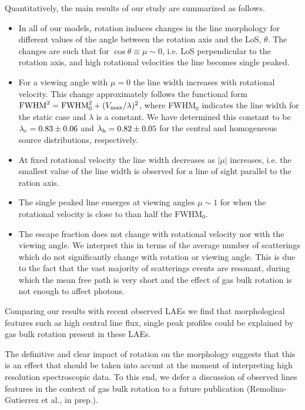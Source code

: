 \documentclass{emulateapj}
\newcommand{\ly}{{\ifmmode{{\rm Ly}\alpha~}\else{Ly$\alpha$~}\fi}}
\begin{document}
Quantitatively, the main results of our study are summarized as
follows. 

\begin{itemize}

\item In all of our models, rotation induces changes in the line morphology
 for different values of the angle between the rotation
 axis and the LoS, $\theta$.  The changes are such that for 
 $\cos\theta\equiv \mu\sim 0$, i.e. LoS perpendicular to the
 rotation axis, and high rotational velocities the line becomes single peaked.

\item For a viewing angle with $\mu=0$ the line width increases with rotational
  velocity. This change approximately follows the functional form  ${\rm FWHM}^2 = {\rm FWHM}_{ 0}^2 + (V_{\rm max}/\lambda)^2$, where FWHM$_{0}$ indicates the line
  width for the static case and $\lambda$ is a constant. We have
  determined this constant to be  $\lambda_{\rm c}=0.83 \pm 0.06$ and
  $\lambda_{\rm h}=0.82\pm 0.05$ for the central and homogeneous source
  distributions, respectively.

\item At fixed rotational velocity the line width decreases as $|\mu|$
  increases, i.e. the smallest value of the line width is observed for
  a line of sight parallel to the ration axis. 

\item The single peaked line emerges at viewing angles $\mu\sim 1$ for
  when the rotational velocity is close to than half the FWHM$_0$.

\item  The escape fraction does not change with rotational velocity
  nor with the viewing angle. We interpret this
  in terms of the average number of scatterings which do not 
  significantly change with rotation or viewing angle. This is due to the  
  fact that the vast majority of scatterings events are resonant, 
  during which the mean free path is very short and the effect of gas
  bulk rotation is not enough to affect \ly photons. 

\end{itemize}

Comparing our results with recent observed LAEs we find that 
morphological features such as high central line flux, single peak
profiles  could be explained by gas bulk  rotation present in these
LAEs. 

The definitive and clear impact of rotation on the \ly morphology
suggests that this is an effect that should be taken into accunt at
the moment of interpreting high resolution spectroscopic data. To this
end, we defer a discussion of observed lines features in the context of gas
bulk rotation to a future publication (Remolina-Gutierrez et al., in
prep.).   
\end{document}

